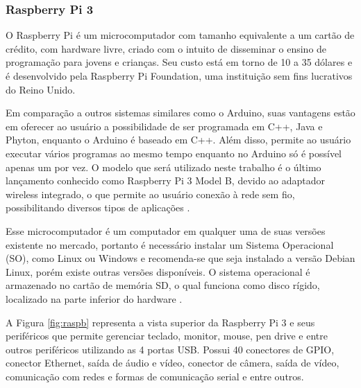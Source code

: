 \documentclass[12pt, a4paper]{article}
\begin{document}
\subsubsection{Raspberry Pi 3}

\hspace*{0.8cm}O Raspberry Pi é um microcomputador com tamanho equivalente a um cartão de crédito, com hardware livre, criado com o intuito de disseminar o ensino de programação para jovens e crianças. Seu custo está em torno de 10 a 35 dólares e é desenvolvido pela Raspberry Pi Foundation, uma instituição sem fins lucrativos do Reino Unido.

Em comparação a outros sistemas similares como o Arduino, suas vantagens estão em oferecer ao usuário a possibilidade de ser programada em C++, Java e Phyton, enquanto o Arduino é baseado em C++.  Além disso, permite ao usuário executar vários programas ao mesmo tempo enquanto no Arduino só é possível apenas um por vez. O modelo que será utilizado neste trabalho é o último lançamento conhecido como Raspberry Pi 3 Model B, devido ao adaptador wireless integrado, o que permite ao usuário conexão à rede sem fio, possibilitando diversos tipos de aplicações \cite{usp}. 

Esse microcomputador é um computador em qualquer uma de suas versões existente no mercado, portanto é necessário instalar um Sistema Operacional (SO), como Linux ou Windows e recomenda-se que seja instalado a versão Debian Linux, porém existe outras versões disponíveis.  O sistema operacional é armazenado no cartão de memória SD, o qual funciona como disco rígido, localizado na parte inferior do hardware \cite{usp}.

A Figura \ref{fig:raspb} representa a vista superior da Raspberry Pi 3 e seus periféricos que permite gerenciar teclado, monitor, mouse, pen drive e entre outros periféricos utilizando as 4 portas USB. Possui 40 conectores de GPIO, conector Ethernet, saída de áudio e vídeo, conector de câmera, saída de vídeo, comunicação com redes e formas de comunicação serial e entre outros.
\end{document}
